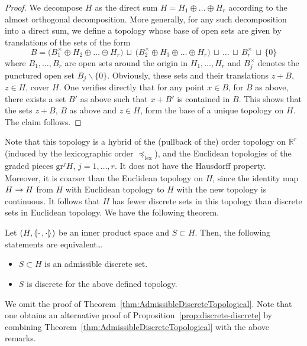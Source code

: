 \documentclass[AHL,Unicode,longabstracts]{cedram}
\newcommand{\llangle}{\mathopen{\langle\mkern -3.1mu\lvert}}
\newcommand{\rrangle}{\mathclose{\rvert\mkern -3.1mu\rangle}}
\newcommand{\highinn}[2]{{\llangle#2\rrangle_{#1}}}
\newcommand{\R}{\mathbb{R}}
\newcommand{\grm}[2]{\mathrm{gr}_{#1}^{#2}}
\renewcommand{\setminus}{\smallsetminus}
\newcommand{\lexeq}{\preceq_{\mathrm{lex}}}
\renewcommand*{\to}{\mathchoice{\longrightarrow}{\rightarrow}{\rightarrow}{\rightarrow}}
\begin{document}
\begin{proof}
We decompose $H$ as the direct sum $H=H_1\oplus \dots \oplus H_r$ according to the almost orthogonal decomposition. More generally, for any such decomposition into a direct sum, we define a topology whose base of open sets are given by translations of the sets of the form
\[
B = \bigl(B_1^\times \oplus H_2 \oplus \dots \oplus H_r\bigr)\, \sqcup \, \bigl(B_2^\times \oplus H_3 \oplus \dots \oplus H_r\bigr) \,\sqcup \, \dots\, \sqcup\, B_r^\times \,\sqcup\, \{0\}
\]
where $B_1, \dots, B_r$ are open sets around the origin in $H_1, \dots, H_r$ and $B_j^\times$ denotes the punctured open set $B_j \setminus\{0\}$. Obviously, these sets and their translations $z+B$, $z\in H$, cover $H$. One verifies directly that for any point $x\in B$, for $B$ as above, there exists a set $B'$ as above such that $x+B'$ is contained in $B$. This shows that the sets $z +B$, $B$ as above and $z \in H$, form the base of a unique topology on $H$. The claim follows.
\end{proof}

Note that this topology is a hybrid of the (pullback of the) order topology on $\R^r$ (induced by the lexicographic order $\lexeq$), and the Euclidean topologies of the graded pieces $\grm{}{j}H$, $j=1, \dots, r$. It does not have the Hausdorff property. Moreover, it is coarser than the Euclidean topology on $H$, since the identity map $H \to H$ from $H$ with Euclidean topology to $H$ with the new topology is continuous. It follows that $H$ has fewer discrete sets in this topology than discrete sets in Euclidean topology. We have the following theorem.

\begin{theo} \label{thm:AdmissibleDiscreteTopological}
Let $(H,\highinn{}{\cdot\,,\cdot})$ be an inner product space and $S \subset H$. Then, the following statements are equivalent\dots
\begin{itemize}
\item $S \subset H$ is an admissible discrete set.

\item $S$ is discrete for the above defined topology.
\end{itemize}
\end{theo}

We omit the proof of Theorem~\ref{thm:AdmissibleDiscreteTopological}. Note that one obtains an alternative proof of Proposition~\ref{prop:discrete-discrete} by combining Theorem~\ref{thm:AdmissibleDiscreteTopological} with the above remarks.
\end{document}

